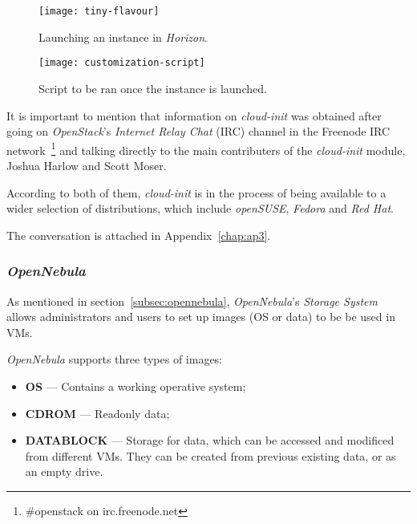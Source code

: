 \begin{figure}[h!]
  \begin{center}
    \leavevmode
    \texttt{[image: tiny-flavour]}
    \caption{Launching an instance in \textit{Horizon}.}
    \label{fig:tiny-flavour}
  \end{center} 
\end{figure}


\begin{figure}[h!]
  \begin{center}
    \leavevmode
    \texttt{[image: customization-script]}
    \caption{Script to be ran once the instance is launched.}
    \label{fig:customization-script}
  \end{center} 
\end{figure}


It is important to mention that information on \textit{cloud-init} was obtained after going on \textit{OpenStack}'s \textit{Internet Relay Chat} (IRC) channel in the Freenode IRC network~\footnote{\#openstack on irc.freenode.net} and talking directly to the main contributers of the \textit{cloud-init} module, Joshua Harlow and Scott Moser.

According to both of them, \textit{cloud-init} is in the process of being available to a wider selection of distributions, which include \textit{openSUSE}, \textit{Fedora} and \textit{Red Hat}. 

The conversation is attached in Appendix~\ref{chap:ap3}.
\clearpage
\subsubsection{\textit{OpenNebula}}

As mentioned in section~\ref{subsec:opennebula}, \textit{OpenNebula}'s \textit{Storage System} allows administrators and users to set up images (OS or data) to be be used in VMs. 

\textit{OpenNebula} supports three types of images:

\begin{itemize}
\item \textbf{OS} --- Contains a working operative system;
\item \textbf{CDROM} --- Readonly data;
\item \textbf{DATABLOCK} --- Storage for data, which can be accessed and modificed from different VMs. They can be created from previous existing data, or as an empty drive.
\end{itemize}

